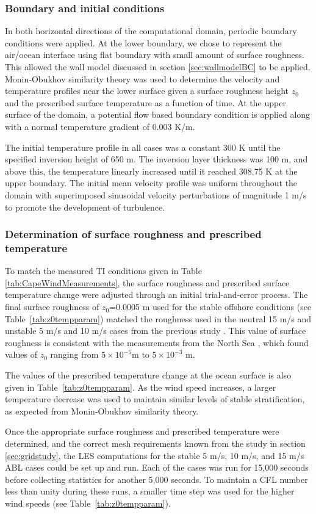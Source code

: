 \subsubsection{Boundary and initial conditions}
In both horizontal directions of the computational domain, periodic
boundary conditions were applied.  At the lower boundary, we chose to
represent the air/ocean interface using flat boundary with small
amount of surface roughness.  This allowed the wall model discussed in
section \ref{sec:wallmodelBC} to be applied.  Monin-Obukhov similarity
theory was used to determine the velocity and temperature profiles
near the lower surface given a surface roughness height $z_0$ and the
prescribed surface temperature as a function of time.  At the upper
surface of the domain, a potential flow based boundary condition is
applied along with a normal temperature gradient of 0.003 K/m.

The initial temperature profile in all cases was a constant 300 K until
the specified inversion height of 650 m.  The inversion layer thickness
was 100 m, and above this, the temperature linearly increased until it
reached 308.75 K at the upper boundary.  The initial mean velocity
profile was uniform throughout the domain with superimposed sinusoidal
velocity perturbations of magnitude 1 m/s to promote the development
of turbulence.

\subsubsection{Determination of surface roughness and prescribed temperature }
To match the measured TI conditions given in Table
\ref{tab:CapeWindMeasurements}, the surface roughness and prescribed
surface temperature change were adjusted through an initial
trial-and-error process.  The final surface roughness of $z_0$=0.0005 m
used for the stable offshore conditions (see Table~\ref{tab:z0tempparam})
matched the roughness used in the neutral 15 m/s and unstable 5 m/s and
10 m/s cases from the previous study \cite{cheung2020large}.  This
value of surface roughness is consistent with the measurements from
the North Sea \cite{taylor2001dependence}, which found values of $z_0$
ranging from $5 \times 10^{-5}$m to $5\times 10^{-3}$ m.

The values of the prescribed temperature change at the ocean surface
is also given in Table~\ref{tab:z0tempparam}.  As the wind
speed increases, a larger temperature decrease was used to maintain
similar levels of stable stratification, as expected from
Monin-Obukhov similarity theory.

Once the appropriate surface roughness and prescribed temperature were
determined, and the correct mesh requirements known from the study in
section \ref{sec:gridstudy}, the LES computations for the stable 5 m/s,
10 m/s, and 15 m/s ABL cases could be set up and run.  Each of the cases
was run for 15,000 seconds before collecting statistics for another
5,000 seconds.  To maintain a CFL number less than unity during these
runs, a smaller time step was used for the higher wind speeds (see
Table~\ref{tab:z0tempparam}).
